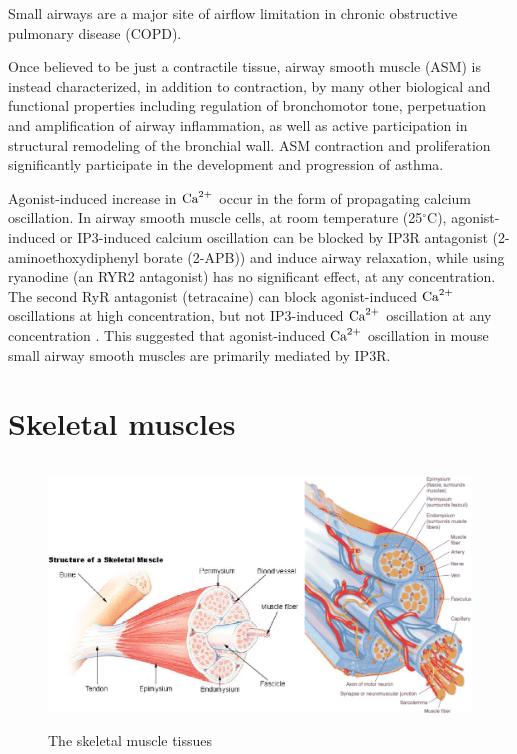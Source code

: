 Small airways are a major site of airflow limitation in chronic obstructive
pulmonary disease (COPD).

Once believed to be just a contractile tissue, airway smooth muscle (ASM) is
instead characterized, in addition to contraction, by many other biological and
functional properties including regulation of bronchomotor tone, perpetuation
and amplification of airway inflammation, as well as active participation in
structural remodeling of the bronchial wall.
ASM contraction and proliferation significantly participate in the development
and progression of asthma.


Agonist-induced increase in ${\text{Ca}^{2+}}$ occur in the form of propagating calcium
oscillation. In airway smooth muscle cells, at room temperature (25$^\circ$C),
agonist-induced or IP3-induced calcium oscillation can be blocked by IP3R
antagonist (2-aminoethoxydiphenyl borate (2-APB)) and induce airway relaxation,
while using ryanodine (an RYR2 antagonist) has no significant effect, at any
concentration. The second RyR antagonist (tetracaine) can block agonist-induced
${\text{Ca}^{2+}}$ oscillations at high concentration, but not IP3-induced ${\text{Ca}^{2+}}$ oscillation
at any concentration \citep{bai2009}. This suggested that agonist-induced ${\text{Ca}^{2+}}$
oscillation in mouse small airway smooth muscles are primarily mediated by IP3R.





\section{Skeletal muscles}
\label{sec:skeletal-muscles}

\begin{figure}[hbt]
  \centerline{\includegraphics[height=7cm,
    angle=0]{./images/skeletal_muscle_tissue.eps}}
  \caption{The skeletal muscle tissues}
\label{fig:skeletal_tissue}
\end{figure}

